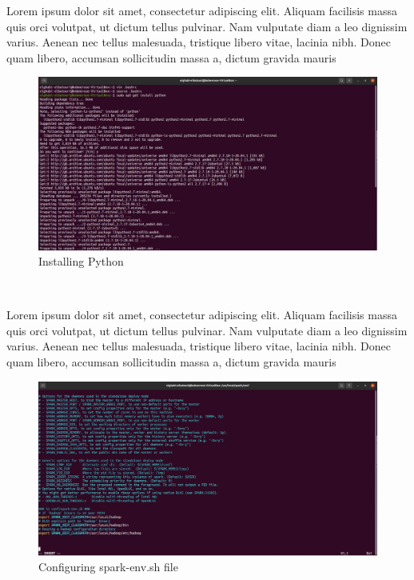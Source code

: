 \begin{spacing}{1.2}
\par Lorem ipsum dolor sit amet, consectetur adipiscing elit. Aliquam facilisis massa quis orci volutpat, ut dictum tellus pulvinar. Nam vulputate diam a leo dignissim varius. Aenean nec tellus malesuada, tristique libero vitae, lacinia nibh. Donec quam libero, accumsan sollicitudin massa a, dictum gravida mauris
\\
\begin{figure}[!htb] 
\begin{center} 
\includegraphics[width=1\linewidth]{Pictures/HBase/Data processing with Spark/Installing and Configuring Spark-2.4.3/Installing Python} 
\end{center} 
\caption{Installing Python} 
\end{figure}  \FloatBarrier
\\

\par Lorem ipsum dolor sit amet, consectetur adipiscing elit. Aliquam facilisis massa quis orci volutpat, ut dictum tellus pulvinar. Nam vulputate diam a leo dignissim varius. Aenean nec tellus malesuada, tristique libero vitae, lacinia nibh. Donec quam libero, accumsan sollicitudin massa a, dictum gravida mauris
\\
\begin{figure}[!htb] 
\begin{center} 
\includegraphics[width=1\linewidth]{Pictures/HBase/Data processing with Spark/Installing and Configuring Spark-2.4.3/Configuring spark-env.sh file} 
\end{center} 
\caption{Configuring spark-env.sh file} 
\end{figure}  \FloatBarrier
\\


\end{spacing}
